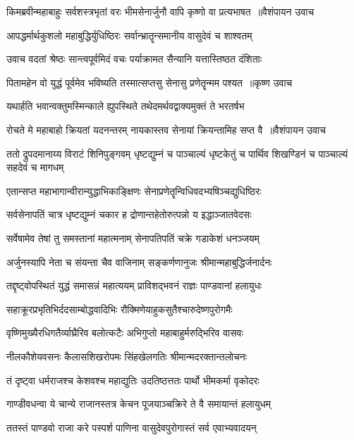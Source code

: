 \threelineshloka
{किमब्रवीन्महाबाहुः सर्वशस्त्रभृतां वरः}
{भीमसेनार्जुनौ वापि कृष्णो वा प्रत्यभाषत ॥वैशंपायन उवाच}
{}


\twolineshloka
{आपद्धर्मार्थकुशलो महाबुद्धिर्युधिष्ठिरः}
{सर्वान्भ्रातॄन्समानीय वासुदेवं च शाश्वतम्}


\twolineshloka
{उवाच वदतां श्रेष्ठः सान्त्वपूर्वमिदं वचः}
{पर्याक्रामत सैन्यानि यत्तास्तिष्ठत दंशिताः}


\threelineshloka
{पितामहेन वो युद्धं पूर्वमेव भविष्यति}
{तस्मात्सप्तसु सेनासु प्रणेतॄन्मम पश्यत ॥कृष्ण उवाच}
{}


\twolineshloka
{यथार्हति भवान्वक्तुमस्मिन्काले ह्युपस्थिते}
{तथेदमर्थवद्वाक्यमुक्तं ते भरतर्षभ}


\threelineshloka
{रोचते मे महाबाहो क्रियतां यदनन्तरम्}
{नायकास्तव सेनायां क्रियन्तामिह सप्त वै ॥वैशंपायन उवाच}
{}


\threelineshloka
{ततो द्रुपदमानाय्य विराटं शिनिपुङ्गवम्}
{धृष्टद्युम्नं च पाञ्चाल्यं धृष्टकेतुं च पार्थिव}
{शिखण्डिनं च पाञ्चाल्यं सहदेवं च मागधम्}


\twolineshloka
{एतान्सप्त महाभागान्वीरान्युद्धाभिकाङ्क्षिणः}
{सेनाप्रणेतॄन्विधिवदभ्यषिञ्चद्युधिष्ठिरः}


\twolineshloka
{सर्वसेनापतिं चात्र धृष्टद्युम्नं चकार ह}
{द्रोणान्तहेतोरुत्पन्नो य इद्धाञ्जातवेदसः}


\twolineshloka
{सर्वेषामेव तेषां तु समस्तानां महात्मनाम्}
{सेनापतिपतिं चक्रे गडाकेशं धनञ्जयम्}


\twolineshloka
{अर्जुनस्यापि नेता च संयन्ता चैव वाजिनाम्}
{सङ्कर्णणानुजः श्रीमान्महाबुद्धिर्जनार्दनः}


\twolineshloka
{तद्दृष्ट्वोपस्थितं युद्धं समासन्नं महात्ययम्}
{प्राविशद्भवनं राज्ञः पाण्डवानां हलायुधः}


\twolineshloka
{सहाक्रूरप्रभृतिभिर्ददसाम्बोद्धवादिभिः}
{रौक्मिणेयाहुकसुतैश्चारुदेष्णपुरोगमैः}


\twolineshloka
{वृष्णिमुख्यैरधिगतैर्व्याघ्रैरिव बलोत्कटैः}
{अभिगुप्तो महाबाहुर्मरुद्भिरिव वासवः}


\twolineshloka
{नीलकौशेयवसनः कैलासशिखरोपमः}
{सिंहखेलगतिः श्रीमान्मदरक्तान्तलोचनः}


\twolineshloka
{तं दृष्ट्वा धर्मराजश्च केशवश्च महाद्युतिः}
{उदतिष्ठत्ततः पार्थो भीमकर्मा वृकोदरः}


\twolineshloka
{गाण्डीवधन्वा ये चान्ये राजानस्तत्र केचन}
{पूजयाञ्चक्रिरे ते वै समायान्तं हलायुधम्}


\twolineshloka
{ततस्तं पाण्डवो राजा करे पस्पर्श पाणिना}
{वासुदेवपुरोगास्तं सर्व एवाभ्यवादयन्}


